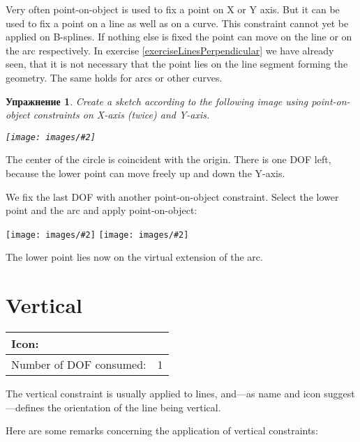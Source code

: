 \documentclass[12pt,titlepage]{article}
\newcommand{\icon}[1]{\raisebox{-1em}{\rule{0pt}{27pt}\texttt{[image: images/\#1]}}}
\newcommand{\img}[2]{\vspace{2ex}\noindent\texttt{[image: images/\#2]}}
\newcommand{\dofConsumed}{Number of DOF consumed:}
\newtheorem{Exercise}{Упражнение}
\begin{document}
Very often point-on-object is used to fix a point on X or Y axis. But it can be used
to fix a point on a line as well as on a curve. This constraint cannot yet be applied
on B-splines. If nothing else is fixed the point can move on the line or on the arc
respectively.
In exercise \vref{exerciseLinesPerpendicular} we have already seen, that it is not
necessary that the point lies on the line segment forming the geometry. The same
holds for arcs or other curves.

\begin{Exercise}
Create a sketch according to the following image using point-on-object constraints on
X-axis (twice) and Y-axis.

\img{}{PointOnLine1}
\end{Exercise}

The center of the circle is coincident with the origin. There is one DOF left,
because the lower point can move freely up and down the Y-axis.

We fix the last DOF with another point-on-object constraint. Select the lower point
and the arc and apply point-on-object:

\img{height=5cm}{PointOnLine2}
\hspace{1cm}
\raisebox{2cm}{$\stackrel{\icon{Constraint_PointOnObject}}{\longrightarrow}$}
\hspace{1cm}
\img{height=5cm}{PointOnLine3}

The lower point lies now on the virtual extension of the arc.


\section{Vertical}
\label{Vertical}
\begin{tabular}{|l|l|}
\hline
Icon: & \icon{Constraint_Vertical}\\
\hline
\dofConsumed & 1 \\
\hline
\end{tabular}

The vertical constraint is usually applied to lines, and---as name and icon
suggest---defines the orientation of the line being vertical.

Here are some remarks concerning the application of vertical constraints:
\end{document}
